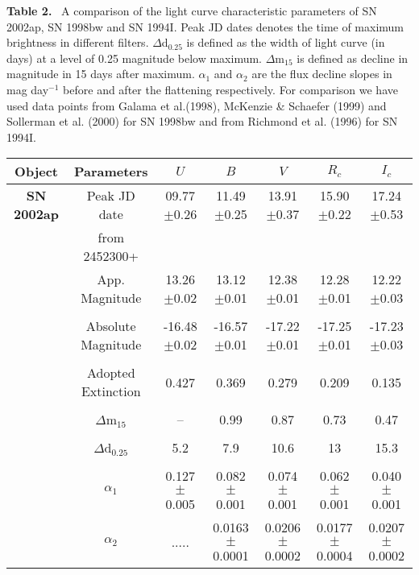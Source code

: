 \begin{table*}
\scriptsize
{\bf Table 2.}~ A comparison of the light curve characteristic parameters of 
SN 2002ap, SN 1998bw 
and SN 1994I. Peak JD dates denotes the time of maximum brightness in different filters. 
$\Delta$d$_{0.25}$ is defined as the width of light curve (in days) at a level of 0.25 magnitude 
below maximum.  $\Delta$m$_{15}$ is defined as decline in magnitude in 15 days after maximum. 
$\alpha_1$ and $\alpha_2$ are the flux decline slopes in mag day$^{-1}$ before 
and after the flattening respectively. 
For comparison we have used data points from Galama et al.(1998), 
McKenzie \& Schaefer (1999) and 
Sollerman et al. (2000) for SN 1998bw and from Richmond et al. (1996) for 
SN 1994I.
\begin{center}
\begin{tabular}{ccccccc} \hline
Object & Parameters   &   $U$   &  $B$  &  $V$  &  $R_c$  &  $I_c$  \\ \hline \hline

{\bf SN 2002ap}&Peak JD date&09.77$\pm$0.26&11.49$\pm$0.25&13.91$\pm$0.37&15.90$\pm$0.22&17.24$\pm$0.53\\
&from 2452300+ &&&&&\\
&App. Magnitude&13.26$\pm$0.02&13.12$\pm$0.01&12.38$\pm$0.01&12.28$\pm$0.01&12.22$\pm$0.03 \\
            &&&&&&\\
&Absolute Magnitude&-16.48$\pm$0.02&-16.57$\pm$0.01&-17.22$\pm$0.01&-17.25$\pm$0.01&-17.23$\pm$0.03\\
            &&&&&&\\
&Adopted Extinction&0.427&0.369&0.279&0.209&0.135\\
            &&&&&&\\
&$\Delta$m$_{15}$ &--&0.99&0.87&0.73&0.47 \\
            &&&&&&\\
&$\Delta$d$_{0.25}$ &5.2&7.9&10.6&13&15.3 \\
            &&&&&&\\
&$\alpha_1$&0.127$\pm$0.005&0.082$\pm$0.001&0.074$\pm$0.001&0.062$\pm$0.001&0.040$\pm$0.001 \\
&$\alpha_2$&..... &0.0163$\pm$0.0001&0.0206$\pm$0.0002&0.0177$\pm$0.0004&0.0207$\pm$0.0002 \\


\end{tabular}
\end{center}
\end{table*}
